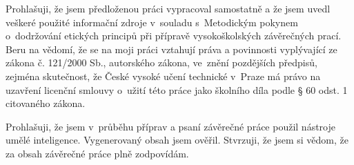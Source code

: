 \documentclass[czech,master,unicode]{ctufit-thesis}
\begin{document}
\begin{declarationpage}
Prohlašuji, že jsem předloženou práci vypracoval samostatně a že jsem uvedl veškeré
použité informační zdroje v~souladu s~Metodickým pokynem o~dodržování etických
principů při přípravě vysokoškolských závěrečných prací.
Beru na vědomí, že se na moji práci vztahují práva a povinnosti vyplývající ze zákona
č. 121/2000 Sb., autorského zákona, ve~znění pozdějších předpisů, zejména
skutečnost, že České vysoké učení technické v~Praze má právo na uzavření licenční
smlouvy o~užití této práce jako školního díla podle § 60 odst. 1 citovaného zákona.

\vspace{1em}


Prohlašuji, že jsem v~průběhu příprav a psaní závěrečné práce použil nástroje umělé
inteligence. Vygenerovaný obsah jsem ověřil. 
Stvrzuji, že jsem si vědom, že za obsah závěrečné práce plně zodpovídám.
\end{declarationpage}

\printabstractpage %

\tableofcontents %
\listoffigures %
\begingroup
\let\clearpage\relax
\listoftables %
\thectufitlistingscommand
\endgroup

\chapter{\thectufitabbreviationlabel}
 
\end{document}
